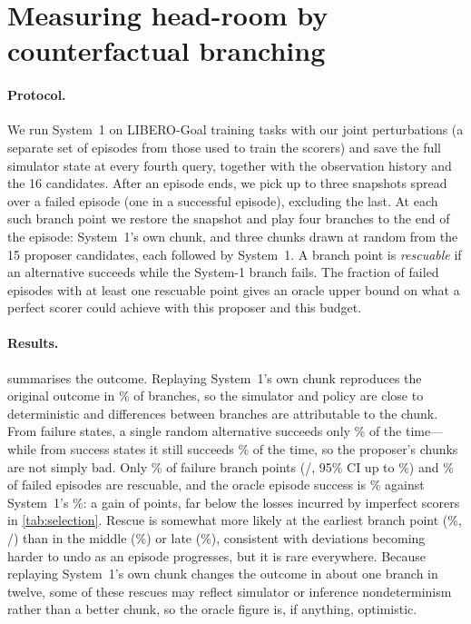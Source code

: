\documentclass{article}
\begin{document}
\section{Measuring head-room by counterfactual branching}
\label{sec:headroom}

\paragraph{Protocol.} We run System~1 on LIBERO-Goal training tasks with our joint perturbations (a separate set of episodes from those used to train the scorers) and save the full simulator state at every fourth query, together with the observation history and the 16 candidates. After an episode ends, we pick up to three snapshots spread over a failed episode (one in a successful episode), excluding the last. At each such branch point we restore the snapshot and play four branches to the end of the episode: System~1's own chunk, and three chunks drawn at random from the 15 proposer candidates, each followed by System~1. A branch point is \emph{rescuable} if an alternative succeeds while the System-1 branch fails. The fraction of failed episodes with at least one rescuable point gives an oracle upper bound on what a perfect scorer could achieve with this proposer and this budget.

\paragraph{Results.}  summarises the outcome. Replaying System~1's own chunk reproduces the original outcome in \repro\% of branches, so the simulator and policy are close to deterministic and differences between branches are attributable to the chunk. From failure states, a single random alternative succeeds only \altFail\% of the time---while from success states it still succeeds \altSucc\% of the time, so the proposer's chunks are not simply bad. Only \rescPts\% of failure branch points (\rescPtsK/\rescPtsN, 95\% CI up to \rescPtsHi\%) and \rescEps\% of failed episodes are rescuable, and the oracle episode success is \oracle\% against System~1's \sOneSucc\%: a gain of \oracleGain{} points, far below the losses incurred by imperfect scorers in \cref{tab:selection}. Rescue is somewhat more likely at the earliest branch point (\posEarly\%, \posEarlyK/\posEarlyN) than in the middle (\posMiddle\%) or late (\posLate\%), consistent with deviations becoming harder to undo as an episode progresses, but it is rare everywhere. Because replaying System~1's own chunk changes the outcome in about one branch in twelve, some of these rescues may reflect simulator or inference nondeterminism rather than a better chunk, so the oracle figure is, if anything, optimistic.
\end{document}
